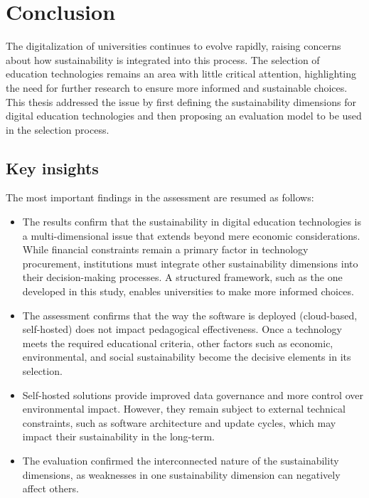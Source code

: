 \chapter{Conclusion}
\label{cha:6_conclusion}
The digitalization of universities continues to evolve rapidly, raising concerns about how sustainability is integrated into this process. The selection of education technologies remains an area with little critical attention, highlighting the need for further research to ensure more informed and sustainable choices. This thesis addressed the issue by first defining the sustainability dimensions for digital education technologies and then proposing an evaluation model to be used in the selection process.

\section{Key insights}
The most important findings in the assessment are resumed as follows:
\begin{itemize}[noitemsep, topsep=4pt, parsep=0pt, partopsep=0pt]
    \item The results confirm that the sustainability in digital education technologies is a multi-dimensional issue that extends beyond mere economic considerations. While financial constraints remain a primary factor in technology procurement, institutions must integrate other sustainability dimensions into their decision-making processes. A structured framework, such as the one developed in this study, enables universities to make more informed choices.
    \item The assessment confirms that the way the software is deployed (cloud-based, self-hosted) does not impact pedagogical effectiveness. Once a technology meets the required educational criteria, other factors such as economic, environmental, and social sustainability become the decisive elements in its selection.
    \item Self-hosted solutions provide improved data governance and more control over environmental impact. However, they remain subject to external technical constraints, such as software architecture and update cycles, which may impact their sustainability in the long-term.
    \item The evaluation confirmed the interconnected nature of the sustainability dimensions, as weaknesses in one sustainability dimension can negatively affect others.
\end{itemize}

